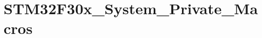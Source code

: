 \hypertarget{group___s_t_m32_f30x___system___private___macros}{\section{S\-T\-M32\-F30x\-\_\-\-System\-\_\-\-Private\-\_\-\-Macros}
\label{group___s_t_m32_f30x___system___private___macros}
}
